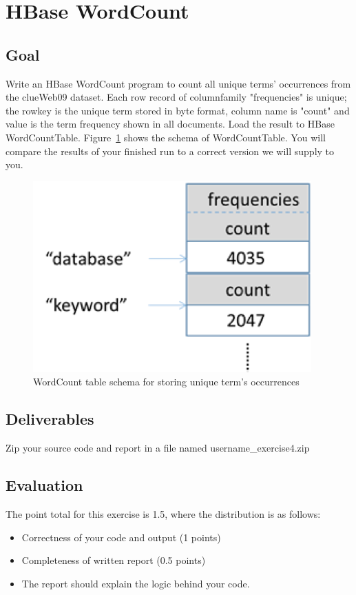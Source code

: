\section*{HBase WordCount}
\subsection*{Goal}
 
Write an HBase WordCount program to count all unique terms' occurrences from
the clueWeb09 dataset. Each row record of columnfamily "frequencies" is unique;
the rowkey is the unique term stored in byte format, column name is "count" and
value is the term frequency shown in all documents. Load the result to HBase
WordCountTable. Figure~\ref{fig:wordcounttablescheme} shows the schema of
WordCountTable. You will compare the results of your finished run to a correct
version we will supply to you.

\begin{figure}[!htbp]
\centering
\includegraphics {section/icloud/assignment/problems/project4/wordcounttablescheme}
\caption{WordCount table schema for storing unique term's occurrences}
\label{fig:wordcounttablescheme}
\end{figure}


\subsection*{Deliverables}  
Zip your source code and report in a file named username\_exercise4.zip

\subsection*{Evaluation} 

The point total for this exercise is 1.5, where the distribution is as follows:
\begin{itemize} 
\item Correctness of your code and output (1 points)
\item	Completeness of written report (0.5 points)
\item	The report should explain the logic behind your code.
\end{itemize}
 

